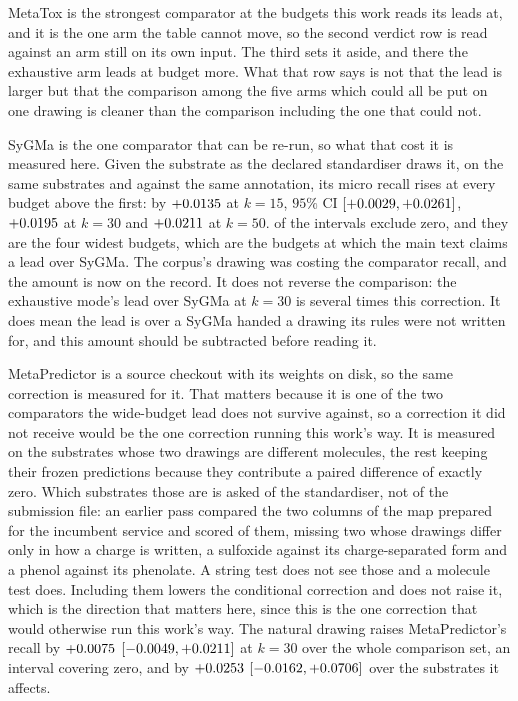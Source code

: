 \documentclass[journal=jcisd8,manuscript=suppinfo,layout=onecolumn]{achemso}
\begin{document}


MetaTox is the strongest comparator at the budgets this work reads its leads at, and it is the one
arm the table cannot move, so the second verdict row is read against an arm still on its own
input. The third sets it aside, and there the exhaustive arm leads at
\numEqualisedDifferswithoutmetatoxWord{} budget more. What that row says is not that the lead is
larger but that the comparison among the five arms which could all be put on one drawing is
cleaner than the comparison including the one that could not.

SyGMa is the one comparator that can be re-run, so what that cost it is measured here. Given the
substrate as the declared standardiser draws it, on the same \numSygdialN{}
substrates and against the same annotation, its micro recall rises at every budget above the
first: by $+0.0135$ at $k=15$, $95\%$ CI
$[+0.0029, +0.0261]$, $+0.0195$ at $k=30$ and
$+0.0211$ at $k=50$. \numSygdialSeparating{} of the \numSygdialBudgets{}
intervals exclude zero, and they are the four widest budgets, which are the budgets at which
the main text claims a lead over SyGMa. The corpus's drawing was costing the comparator recall,
and the amount is now on the record. It does not reverse the comparison: the exhaustive mode's
lead over SyGMa at $k=30$ is several times this correction. It does mean the lead is over a SyGMa
handed a drawing its rules were not written for, and this amount should be subtracted before reading
it.

MetaPredictor is a source checkout with its weights on disk, so the same correction is measured
for it. That matters because it is one of the two comparators the wide-budget lead does not survive
against, so a correction it did not receive would be the one correction running this work's way.
It is measured on the \numMpdrawRerun{} substrates whose two drawings are different molecules, the
rest keeping their frozen predictions because they contribute a paired difference of exactly
zero. Which substrates those are is asked of the standardiser, not of the submission file: an
earlier pass compared the two columns of the map prepared for the incumbent service and scored
\numMpdrawRerunOld{} of them, missing two whose drawings differ only in how a charge is written, a
sulfoxide against its charge-separated form and a phenol against its phenolate. A string test does
not see those and a molecule test does. Including them lowers the conditional correction and does
not raise it, which is the direction that matters here, since this is the one correction that
would otherwise run this work's way. The natural drawing raises MetaPredictor's recall by
$+0.0075$ $[-0.0049, +0.0211]$ at $k=30$
over the whole comparison set, an interval covering zero, and by
$+0.0253$ $[-0.0162, +0.0706]$
over the \numMpdrawMovedN{} substrates it affects.
\end{document}
